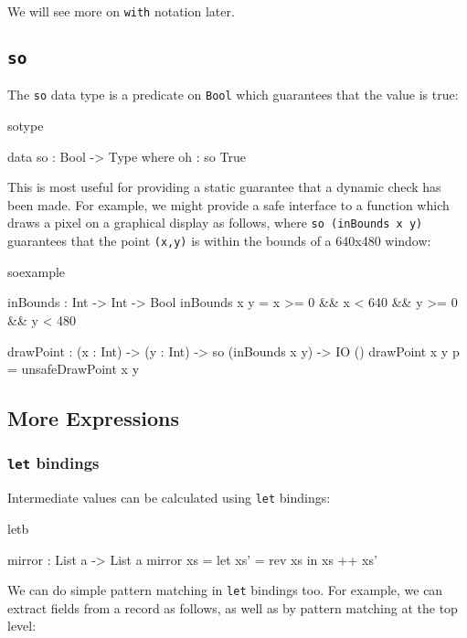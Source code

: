 \noindent
We will see more on \texttt{with} notation later.

\subsection{\texttt{so}}

The \texttt{so} data type is a predicate on \texttt{Bool} which guarantees that the
value is true:

\begin{SaveVerbatim}{sotype}

data so : Bool -> Type where
    oh : so True

\end{SaveVerbatim}

\noindent
This is most useful for providing a static guarantee that a dynamic check has been made.
For example, we might provide a safe interface to a function which draws a pixel
on a graphical display as follows, where \texttt{so (inBounds x y)} guarantees that 
the point \texttt{(x,y)} is within the bounds of a 640x480 window:

\begin{SaveVerbatim}{soexample}

inBounds : Int -> Int -> Bool
inBounds x y = x >= 0 && x < 640 && y >= 0 && y < 480

drawPoint : (x : Int) -> (y : Int) -> so (inBounds x y) -> IO ()
drawPoint x y p = unsafeDrawPoint x y

\end{SaveVerbatim}

\subsection{More Expressions}

\subsubsection*{\texttt{let} bindings}

Intermediate values can be calculated using \texttt{let} bindings:

\begin{SaveVerbatim}{letb}

mirror : List a -> List a
mirror xs = let xs' = rev xs in
                xs ++ xs'

\end{SaveVerbatim}

\noindent
We can do simple pattern matching in \texttt{let} bindings too. For example, we can extract
fields from a record as follows, as well as by pattern matching at the top level:


